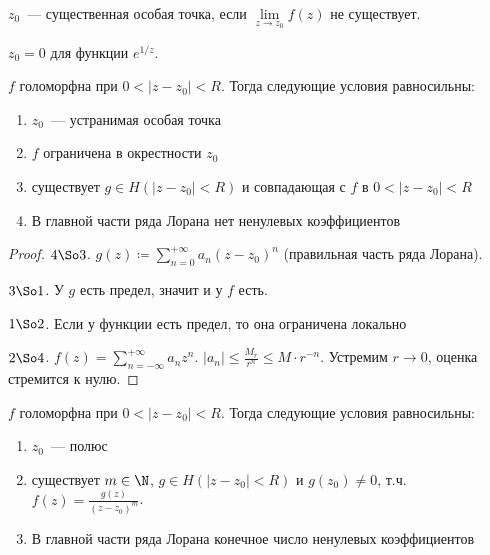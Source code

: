 \begin{definition}
    $z_0$~--- существенная особая точка, если
    $\lim\limits_{z\to z_0} f(z)$ не существует.
\end{definition}

\begin{example}
    $z_0 = 0$ для функции $e^{1/z}$.
\end{example}

\begin{theorem}

    $f$ голоморфна при $0 < |z-z_0| < R$. Тогда
    следующие условия равносильны:

    \begin{enumerate}
        \item $z_0$~--- устранимая особая точка
        \item $f$ ограничена в окрестности $z_0$
        \item существует $g \in H(|z-z_0|<R)$ и совпадающая с
              $f$ в $0 < |z-z_0| < R$
        \item В главной части ряда Лорана нет ненулевых коэффициентов
    \end{enumerate}
\end{theorem}

\begin{proof}
    $4 \So 3$.
    $g(z) \coloneqq \sum\limits_{n=0}^{+\infty} a_n(z-z_0)^n$ (правильная
    часть ряда Лорана).

    $3 \So 1$. У $g$ есть предел, значит и у $f$ есть.

    $1 \So 2$. Если у функции есть предел, то она ограничена локально

    $2 \So 4$.
    $f(z) = \sum\limits_{n=-\infty}^{+\infty} a_nz^n$.
    $|a_n| \le \frac{M_r}{r^n} \le M \cdot r^{-n}$.
    Устремим $r \to 0$, оценка стремится к нулю.
\end{proof}

\begin{theorem}

    $f$ голоморфна при $0 < |z-z_0| < R$. Тогда
    следующие условия равносильны:

    \begin{enumerate}
        \item $z_0$~--- полюс
        \item существует $m \in \N$, $g \in H(|z-z_0|<R)$
              и $g(z_0) \ne 0$, т.ч. $f(z) = \frac{g(z)}{(z-z_0)^m}$.
        \item В главной части ряда Лорана конечное число
              ненулевых коэффициентов
    \end{enumerate}
\end{theorem}

